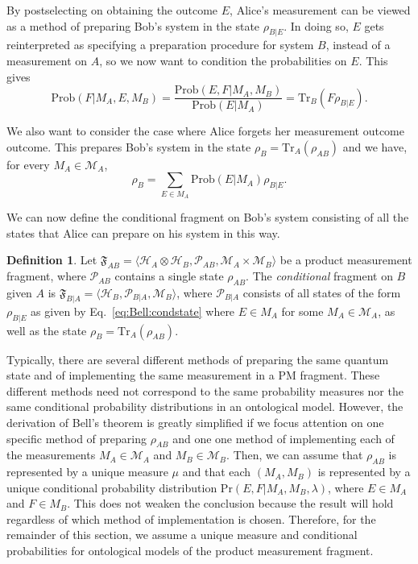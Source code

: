 \documentclass[DIV=calc,fontsize=12pt]{scrartcl} %
\theoremstyle{definition}
\newtheorem{definition}{Definition}[section]
\theoremstyle{plain}
\newcommand{\Hilb}[1][]{\ensuremath{\mathcal{H}_{#1}}}
\newcommand{\Tr}[2][]{\ensuremath{\text{Tr}_{#1} \left ( #2 \right )}}
\begin{document}
By postselecting on obtaining the outcome $E$, Alice's measurement can
be viewed as a method of preparing Bob's system in the state
$\rho_{B|E}$.  In doing so, $E$ gets reinterpreted as specifying a
preparation procedure for system $B$, instead of a measurement on $A$,
so we now want to condition the probabilities on $E$.  This gives
\begin{equation}
\text{Prob}(F|M_A,E,M_B) =
\frac{\text{Prob}(E,F|M_A,M_B)}{\text{Prob}(E|M_A)}
= \Tr[B]{F \rho_{B|E}}. \label{eq:Bell:cond}
\end{equation}

We also want to consider the case where Alice forgets her measurement
outcome outcome.  This prepares Bob's system in the state $\rho_B =
\Tr[A]{\rho_{AB}}$ and we have, for every $M_A \in \mathcal{M}_A$,
\begin{equation}
\rho_B = \sum_{E \in M_A} \text{Prob}(E|M_A) \rho_{B|E}.
\end{equation}

We can now define the conditional fragment on Bob's system consisting
of all the states that Alice can prepare on his system in this way.
\begin{definition}
Let $\mathfrak{F}_{AB} = \langle \Hilb[A] \otimes \Hilb[B],
\mathcal{P}_{AB}, \mathcal{M}_A \times \mathcal{M}_B \rangle$ be a
product measurement fragment, where $\mathcal{P}_{AB}$ contains a
single state $\rho_{AB}$.  The \emph{conditional} fragment on $B$
given $A$ is $\mathfrak{F}_{B|A} = \langle \Hilb[B],
\mathcal{P}_{B|A}, \mathcal{M}_B \rangle$, where $\mathcal{P}_{B|A}$
consists of all states of the form $\rho_{B|E}$ as given by
Eq.~\eqref{eq:Bell:condstate} where $E \in M_A$ for some $M_A \in
\mathcal{M}_A$, as well as the state $\rho_B = \Tr[A]{\rho_{AB}}$.
\end{definition}

Typically, there are several different methods of preparing the same
quantum state and of implementing the same measurement in a PM
fragment.  These different methods need not correspond to the same
probability measures nor the same conditional probability
distributions in an ontological model.  However, the derivation of
Bell's theorem is greatly simplified if we focus attention on one
specific method of preparing $\rho_{AB}$ and one one method of
implementing each of the measurements $M_A \in \mathcal{M}_A$ and $M_B
\in \mathcal{M}_B$.  Then, we can assume that $\rho_{AB}$ is
represented by a unique measure $\mu$ and that each $(M_A,M_B)$ is
represented by a unique conditional probability distribution
$\text{Pr}(E,F|M_A,M_B,\lambda)$, where $E \in M_A$ and $F \in M_B$.
This does not weaken the conclusion because the result will hold
regardless of which method of implementation is chosen.  Therefore,
for the remainder of this section, we assume a unique measure and
conditional probabilities for ontological models of the product
measurement fragment.
\end{document}
